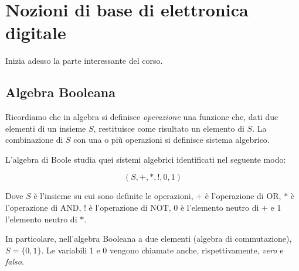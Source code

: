 \documentclass{article}
\begin{document}
\clearpage













\section{Nozioni di base di elettronica digitale}

Inizia adesso la parte interessante del corso.

\subsection{Algebra Booleana}

Ricordiamo che in algebra si definisce \textit{operazione} una funzione che, dati due elementi di un insieme $S$, restituisce come risultato un elemento di $S$. La combinazione di $S$ con una o più operazioni si definisce sistema algebrico.

L'algebra di Boole studia quei sistemi algebrici identificati nel seguente modo:

\[(S, +, *, !, 0, 1)\]

Dove $S$ è l'insieme su cui sono definite le operazioni, $+$ è l'operazione di OR, $*$ è l'operazione di AND, $!$ è l'operazione di NOT, 0 è l'elemento neutro di $+$ e 1 l'elemento neutro di $*$. 

\vspace{1mm}

In particolare, nell'algebra Booleana a due elementi (algebra di commutazione), $S = \{0, 1\}$. Le variabili 1 e 0 vengono chiamate anche, rispettivamente, \textit{vero} e \textit{falso}.
\end{document}
